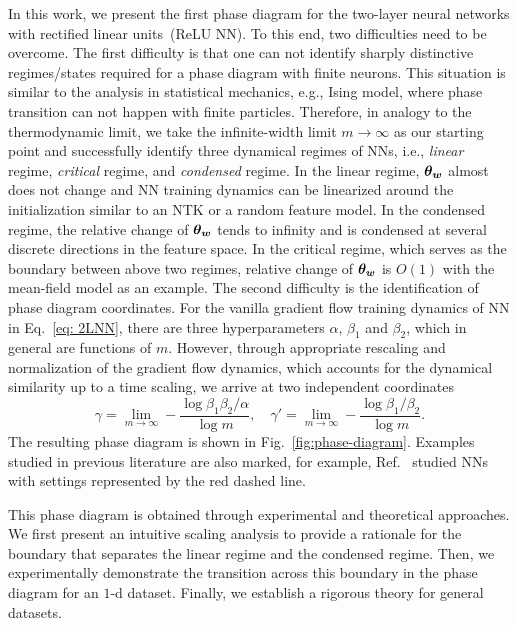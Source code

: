 \documentclass[twoside,11pt]{article}
\begin{document}
In this work, we present the first phase diagram for the two-layer neural networks with rectified linear units~(ReLU NN). To this end, two difficulties need to be overcome. The first difficulty is that one can not identify sharply distinctive regimes/states required for a phase diagram with finite neurons. This situation is similar to the analysis in statistical mechanics, e.g., Ising model, where phase transition can not happen with finite particles. Therefore, in analogy to the thermodynamic limit, we take the infinite-width limit $m\to\infty$ as our starting point and successfully identify three dynamical regimes of NNs, i.e., \emph{linear} regime, \emph{critical} regime, and \emph{condensed} regime. In the linear regime, $\bm{\theta}_{\bm{w}}$ almost does not change and NN training dynamics can be linearized around the initialization similar to an NTK or a random feature model. In the condensed regime, the relative change of $\bm{\theta}_{\bm{w}}$ tends to infinity and is condensed at several discrete directions in the feature space. In the critical regime, which serves as the boundary between above two regimes, relative change of $\bm{\theta}_{\bm{w}}$ is $O(1)$ with the mean-field model as an example. The second difficulty is the identification of phase diagram coordinates. For the vanilla gradient flow training dynamics of NN in Eq.~\eqref{eq: 2LNN}, there are three hyperparameters $\alpha$, $\beta_1$ and $\beta_2$, which in general are functions of $m$. However, through appropriate rescaling and normalization of the gradient flow dynamics, which accounts for the dynamical similarity up to a time scaling, we arrive at two independent coordinates
\begin{equation}
    \gamma=\lim\limits_{m\to\infty}-\frac{\log\beta_1\beta_2/\alpha}{\log m}, \quad \gamma'=\lim\limits_{m\to\infty}-\frac{\log\beta_1/\beta_2}{\log m}.
\end{equation}
The resulting phase diagram is shown in Fig.~\ref{fig:phase-diagram}. Examples studied in previous literature are also marked, for example, Ref.~\cite{e2020comparative} studied NNs with settings represented by the red dashed line.

This phase diagram is obtained through experimental and theoretical approaches. We first present an intuitive scaling analysis to provide a rationale for the boundary that separates the linear regime and the condensed regime. Then, we experimentally demonstrate the transition across this boundary in the phase diagram for an $1$-d dataset. Finally, we establish a rigorous theory for general datasets.
\end{document}
